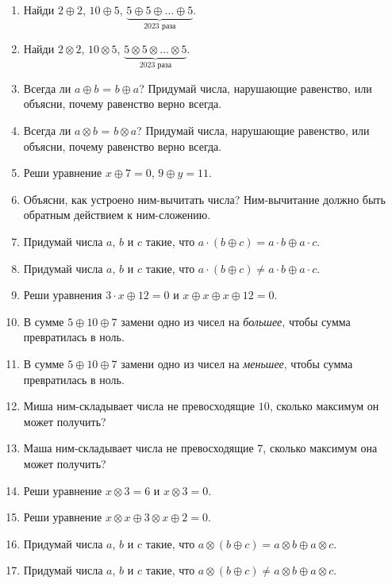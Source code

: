 \documentclass[12pt]{article}
\theoremstyle{definition}
\begin{document}
\begin{enumerate}
  \item Найди $2 \oplus 2$, $10 \oplus 5$, $\underbrace{5 \oplus 5 \oplus \ldots \oplus 5}_{2023 \text{ раза}}$.
  \item Найди $2 \otimes 2$, $10 \otimes 5$, $\underbrace{5 \otimes 5 \otimes \ldots \otimes 5}_{2023 \text{ раза}}$.
  \item Всегда ли $a \oplus b$ = $b \oplus a$? 
  Придумай числа, нарушающие равенство, или объясни, почему равенство верно всегда. 
  \item Всегда ли $a \otimes b$ = $b \otimes a$? 
  Придумай числа, нарушающие равенство, или объясни, почему равенство верно всегда. 
  \item Реши уравнение $x \oplus 7 = 0$, $9 \oplus y = 11$. 
  \item Объясни, как устроено ним-вычитать числа? 
  Ним-вычитание должно быть обратным действием к ним-сложению.
  \item Придумай числа $a$, $b$ и $c$ такие, что $a\cdot (b\oplus c) = a\cdot b \oplus a\cdot c$.
  \item Придумай числа $a$, $b$ и $c$ такие, что $a\cdot (b\oplus c) \neq a\cdot b \oplus a\cdot c$.
  \item Реши уравнения $3\cdot x \oplus 12 = 0$ и $x \oplus x \oplus x \oplus 12 = 0$.
  \item В сумме $5 \oplus 10 \oplus 7$ замени одно из чисел на \textit{большее}, чтобы сумма превратилась в ноль.
  \item В сумме $5 \oplus 10 \oplus 7$ замени одно из чисел на \textit{меньшее}, чтобы сумма превратилась в ноль.
  \item Миша ним-складывает числа не превосходящие $10$, сколько максимум он может получить?
  \item Маша ним-складывает числа не превосходящие $7$, сколько максимум она может получить?
  \item Реши уравнение $x \otimes 3 = 6$ и $x \otimes 3 = 0$.
  \item Реши уравнение $x \otimes x \oplus 3 \otimes x \oplus 2 = 0$.
  \item Придумай числа $a$, $b$ и $c$ такие, что $a\otimes (b\oplus c) = a\otimes b \oplus a\otimes c$.
  \item Придумай числа $a$, $b$ и $c$ такие, что $a\otimes (b\oplus c) \neq a\otimes b \oplus a\otimes c$.
\end{enumerate}

\newpage
\setcounter{section}{0}
\end{document}
